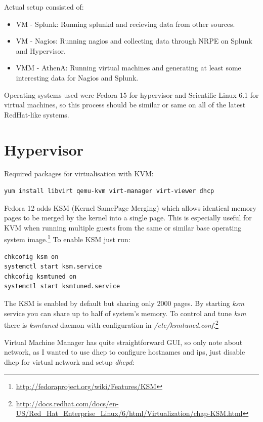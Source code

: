 \documentclass[10pt,a4paper,final]{report}
\begin{document}
Actual setup consisted of:
\begin{itemize}
\item VM - Splunk: Running splunkd and recieving data from other sources.
\item VM - Nagios: Running nagios and collecting data through NRPE on Splunk and Hypervisor.
\item VMM - AthenA: Running virtual machines and generating at least some interesting data for Nagios and Splunk.
\end{itemize}
Operating systems used were Fedora 15 for hypervisor and Scientific Linux 6.1 for virtual machines, so this process should be similar or same on all of the latest RedHat-like systems.

\section{Hypervisor}
Required packages for virtualisation with KVM:
\begin{lstlisting}
yum install libvirt qemu-kvm virt-manager virt-viewer dhcp
\end{lstlisting} 
Fedora 12 adds KSM (Kernel SamePage Merging) which allows identical memory pages to be merged by the kernel into a single page. This is especially useful for KVM when running multiple guests from the same or similar base operating system image.\footnote{\url{http://fedoraproject.org/wiki/Features/KSM}} To enable KSM just run:

\begin{lstlisting}
chkcofig ksm on
systemctl start ksm.service
chkcofig ksmtuned on
systemctl start ksmtuned.service
\end{lstlisting}
The KSM is enabled by default but sharing only 2000 pages. By starting \emph{ksm} service you can share up to half of system's memory. To control and tune \emph{ksm} there is \emph{ksmtuned} daemon with configuration in \emph{/etc/ksmtuned.conf}.\footnote{\url{http://docs.redhat.com/docs/en-US/Red\_Hat\_Enterprise\_Linux/6/html/Virtualization/chap-KSM.html}}

Virtual Machine Manager has quite straightforward GUI, so only note about network, as I wanted to use dhcp to configure hostnames and ips, just disable dhcp for virtual network and setup \emph{dhcpd}:
\end{document}
